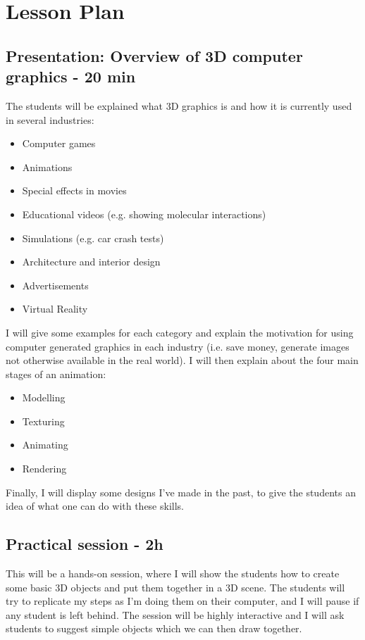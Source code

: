 \documentclass[11pt,a4paper]{article}
\begin{document}
\section{Lesson Plan}

\subsection{Presentation: Overview of 3D computer graphics - 20 min}


The students will be explained what 3D graphics is and how it is currently used in several industries:
\begin{itemize}
 \item Computer games
 \item Animations 
 \item Special effects in movies
 \item Educational videos (e.g. showing molecular interactions)
 \item Simulations (e.g. car crash tests)
 \item Architecture and interior design
 \item Advertisements
 \item Virtual Reality
\end{itemize}

I will give some examples for each category and explain the motivation for using computer generated graphics in each industry (i.e. save money, generate images not otherwise available in the real world). I will then explain about the four main stages of an animation:
\begin{itemize}
 \item Modelling
 \item Texturing
 \item Animating
 \item Rendering
\end{itemize}

Finally, I will display some designs I've made in the past, to give the students an idea of what one can do with these skills.

\subsection{Practical session - 2h}

This will be a hands-on session, where I will show the students how to create some basic 3D objects and put them together in a 3D scene. The students will try to replicate my steps as I'm doing them on their computer, and I will pause if any student is left behind. The session will be highly interactive and I will ask students to suggest simple objects which we can then draw together.
\end{document}
